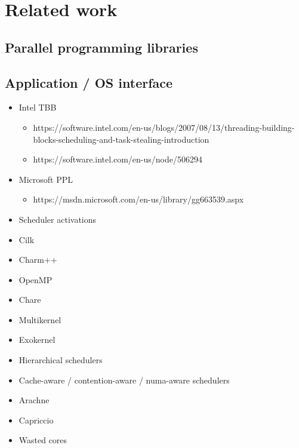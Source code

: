 \section{Related work}
\subsection{Parallel programming libraries}
\subsection{Application / OS interface}
\begin{itemize}
  \item Intel TBB \cite{contreras2008characterizing}
  \begin{itemize}
    \item https://software.intel.com/en-us/blogs/2007/08/13/threading-building-blocks-scheduling-and-task-stealing-introduction
    \item https://software.intel.com/en-us/node/506294
  \end{itemize}
  \item Microsoft PPL
  \begin{itemize}
    \item https://msdn.microsoft.com/en-us/library/gg663539.aspx
  \end{itemize}
  \item Scheduler activations \cite{anderson1992scheduler}
  \item Cilk \cite{blumofe1995cilk}
  \item Charm++
  \item OpenMP
  \item Chare
  \item Multikernel
  \item Exokernel
  \item Hierarchical schedulers
  \item Cache-aware / contention-aware / numa-aware schedulers
  \item Arachne
  \item Capriccio
  \item Wasted cores
\end{itemize}

